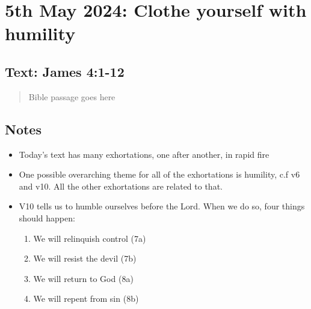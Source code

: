 \setcounter{figure}{0}

\section{5th May 2024: Clothe yourself with humility}
\subsection*{Text: James 4:1-12}
  \begin{quote}
    Bible passage goes here
  \end{quote}
\subsection*{Notes}
\begin{itemize}
  \item Today’s text has many exhortations, one after another, in rapid fire
  \item One possible overarching theme for all of the exhortations is humility, c.f v6 and v10. All the other exhortations are related to that.
  \item V10 tells us to humble ourselves before the Lord. When we do so, four things should happen:
    \begin{enumerate}
      \item We will relinquish control (7a)
      \item We will resist the devil (7b)
      \item We will return to God (8a)
      \item We will repent from sin (8b)
    \end{enumerate}
\end{itemize}
